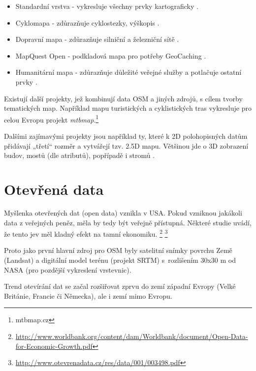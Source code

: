 \begin{itemize}
  \item Standardní vrstva - vykresluje všechny prvky kartograficky  .
  \item Cyklomapa - zdůrazňuje cyklostezky, výškopis .
  \item Dopravní mapa - zdůrazňuje silniční a železniční sítě .
  \item MapQuest Open - podkladová mapa pro potřeby GeoCaching .
  \item Humanitární mapa - zdůrazňuje důležité veřejné služby a potlačuje ostatní prvky . 
\end{itemize}

Existují další projekty, jež kombinují data OSM a jiných zdrojů, s cílem tvorby tematických map.
Například mapu turistických a cyklistických tras vykresluje
pro celou Evropu projekt \textit{mtbmap}.\footnote{mtbmap.cz}

Dalšími zajímavými projekty jsou například ty, které k 2D polohopisných datům přidávají „třetí“ rozměr a
vytvářejí tzv. 2.5D mapu. Většinou jde o 3D zobrazení budov, mostů (dle
atributů), popřípadě i stromů .


\section{Otevřená data}
\label{opendata}

Myšlenka otevřených dat (open data) vznikla v USA.
Pokud vzniknou jakákoli data z veřejných peněz, měla by tedy být
veřejně přístupná. Některé studie uvádí, že tento jev měl kladný efekt na tamní ekonomiku.
\footnote{\url{http://www.worldbank.org/content/dam/Worldbank/document/Open-Data-for-Economic-Growth.pdf}}
\footnote{\url{http://www.otevrenadata.cz/res/data/001/003498.pdf}}

Proto jako první hlavní zdroj pro OSM byly satelitní snímky povrchu Země (Landsat) 
a digitální model terénu (projekt SRTM)
s~rozlišením 30x30 m od NASA (pro pozdější vykreslení vrstevnic).

Trend otevírání dat se začal rozšiřovat zprvu do zemí západní Evropy
(Velké Británie, Francie či Německa), ale i zemí mimo Evropu.\cite{OpendataTrends}

